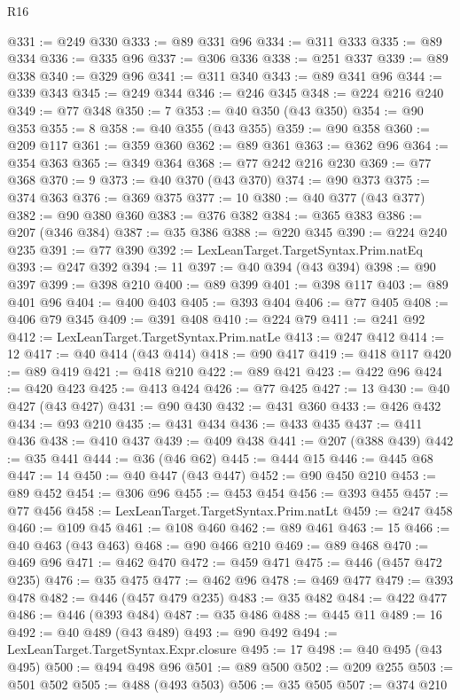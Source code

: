 \begin{lexlean}{R16}
\begin{coremodule}
@331 := @249 @330
@333 := @89 @331 @96
@334 := @311 @333
@335 := @89 @334
@336 := @335 @96
@337 := @306 @336
@338 := @251 @337
@339 := @89 @338
@340 := @329 @96
@341 := @311 @340
@343 := @89 @341 @96
@344 := @339 @343
@345 := @249 @344
@346 := @246 @345
@348 := @224 @216 @240
@349 := @77 @348
@350 := 7
@353 := @40 @350 (@43 @350)
@354 := @90 @353
@355 := 8
@358 := @40 @355 (@43 @355)
@359 := @90 @358
@360 := @209 @117
@361 := @359 @360
@362 := @89 @361
@363 := @362 @96
@364 := @354 @363
@365 := @349 @364
@368 := @77 @242 @216 @230
@369 := @77 @368
@370 := 9
@373 := @40 @370 (@43 @370)
@374 := @90 @373
@375 := @374 @363
@376 := @369 @375
@377 := 10
@380 := @40 @377 (@43 @377)
@382 := @90 @380 @360
@383 := @376 @382
@384 := @365 @383
@386 := @207 (@346 @384)
@387 := @35 @386
@388 := @220 @345
@390 := @224 @240 @235
@391 := @77 @390
@392 := LexLeanTarget.TargetSyntax.Prim.natEq
@393 := @247 @392
@394 := 11
@397 := @40 @394 (@43 @394)
@398 := @90 @397
@399 := @398 @210
@400 := @89 @399
@401 := @398 @117
@403 := @89 @401 @96
@404 := @400 @403
@405 := @393 @404
@406 := @77 @405
@408 := @406 @79 @345
@409 := @391 @408
@410 := @224 @79
@411 := @241 @92
@412 := LexLeanTarget.TargetSyntax.Prim.natLe
@413 := @247 @412
@414 := 12
@417 := @40 @414 (@43 @414)
@418 := @90 @417
@419 := @418 @117
@420 := @89 @419
@421 := @418 @210
@422 := @89 @421
@423 := @422 @96
@424 := @420 @423
@425 := @413 @424
@426 := @77 @425
@427 := 13
@430 := @40 @427 (@43 @427)
@431 := @90 @430
@432 := @431 @360
@433 := @426 @432
@434 := @93 @210
@435 := @431 @434
@436 := @433 @435
@437 := @411 @436
@438 := @410 @437
@439 := @409 @438
@441 := @207 (@388 @439)
@442 := @35 @441
@444 := @36 (@46 @62)
@445 := @444 @15
@446 := @445 @68
@447 := 14
@450 := @40 @447 (@43 @447)
@452 := @90 @450 @210
@453 := @89 @452
@454 := @306 @96
@455 := @453 @454
@456 := @393 @455
@457 := @77 @456
@458 := LexLeanTarget.TargetSyntax.Prim.natLt
@459 := @247 @458
@460 := @109 @45
@461 := @108 @460
@462 := @89 @461
@463 := 15
@466 := @40 @463 (@43 @463)
@468 := @90 @466 @210
@469 := @89 @468
@470 := @469 @96
@471 := @462 @470
@472 := @459 @471
@475 := @446 (@457 @472 @235)
@476 := @35 @475
@477 := @462 @96
@478 := @469 @477
@479 := @393 @478
@482 := @446 (@457 @479 @235)
@483 := @35 @482
@484 := @422 @477
@486 := @446 (@393 @484)
@487 := @35 @486
@488 := @445 @11
@489 := 16
@492 := @40 @489 (@43 @489)
@493 := @90 @492
@494 := LexLeanTarget.TargetSyntax.Expr.closure
@495 := 17
@498 := @40 @495 (@43 @495)
@500 := @494 @498 @96
@501 := @89 @500
@502 := @209 @255
@503 := @501 @502
@505 := @488 (@493 @503)
@506 := @35 @505
@507 := @374 @210

\end{coremodule}
\end{lexlean}
